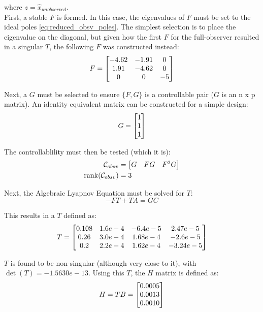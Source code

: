 \documentclass[]{article}
\newcommand{\ctrbl}{\mathcal{C}}
\begin{document}
			where $z = \hat{x}_{unobserved}$.\\
			
			
			First, a stable $F$ is formed. In this case, the eigenvalues of $F$ must be set to the ideal poles \eqref{eq:reduced_obsv_poles}. The simplest selection is to place the eigenvalue on the diagonal, but given how the first $F$ for the full-observer resulted in a singular $T$, the following $F$ was constructed instead:
			\begin{equation}
				F = \mqty[	-4.62  &  -1.91    &    0 \\
							1.91  &  -4.62     &   0  \\
							0   &     0   &    -5]
			\end{equation}
			
			Next, a $G$ must be selected to ensure $\{F,G\}$ is a controllable pair ($G$ is an n x p matrix). An identity equivalent matrix can be constructed for a simple design:
			\begin{equation}
				G = \mqty[1\\1\\1]
			\end{equation}
			
			The controllablility must then be tested (which it is):
			\begin{equation}
				\begin{aligned}
					\ctrbl_{obsv} &= \mqty[G & FG & F^2G]\\
					\rank(\ctrbl_{obsv}) &= 3
				\end{aligned}
				\label{eq:obsv_ctrl_check}
			\end{equation}
			
			Next, the Algebraic Lyapnov Equation must be solved for $T$:
			\begin{equation}
				-F T + T A = G C
			\end{equation}
			
			This results in a $T$ defined as:
			\begin{equation}
				T = \mqty[0.108 & 1.6e-4 & -6.4e-5 & 2.47e-5  \\
				0.26  & 3.0e-4 & 1.68e-4 & -2.6e-5  \\
				0.2   & 2.2e-4 & 1.62e-4 & -3.24e-5]
			\end{equation}
			
			$T$ is found to be non-singular (although very close to it), with $\det(T) = -1.5630e-13$. Using this $T$, the $H$ matrix is defined as:
			\begin{equation}
				H = T B = \mqty[0.0005\\0.0013\\0.0010]
			\end{equation}
			
\end{document}
